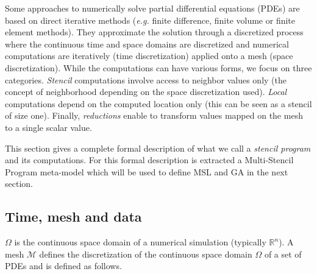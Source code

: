 
Some approaches to numerically solve partial differential equations (PDEs) are based on direct iterative methods (\textit{e.g.} finite difference, finite volume or finite element methods).
They approximate the solution through a discretized process where the continuous time and space domains are discretized and numerical computations are iteratively (time discretization) applied onto a mesh (space discretization).
While the computations can have various forms, we focus on three categories.
\emph{Stencil} computations involve access to neighbor values only (the concept of neighborhood depending on the space discretization used).
\emph{Local} computations depend on the computed location only (this can be seen as a stencil of size one).
Finally, \emph{reductions} enable to transform values mapped on the mesh to a single scalar value.

This section gives a complete formal description of what we call a \textit{stencil program} and its computations. For this formal description is extracted a Multi-Stencil Program meta-model which will be used to define MSL and GA in the next section.

\subsection{Time, mesh and data}

$\Omega$ is the continuous space domain of a numerical simulation (typically $\mathbb{R}^n$). %
A mesh $\mathcal{M}$ defines the discretization of the continuous space domain $\Omega$ of a set of PDEs and is defined as follows.


